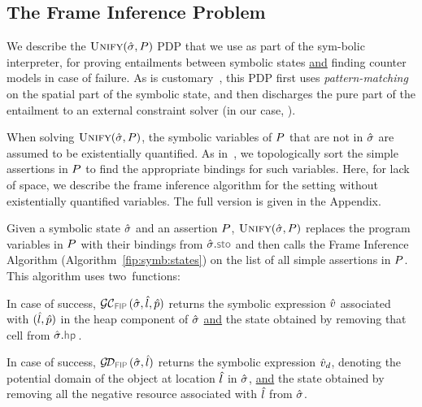 \subsection{The Frame Inference Problem}\label{subsec:fip}

We describe the $\textsc{Unify}(\hat{\sigma}, P)$ PDP that we
use as part of the \jsil sym-bolic interpreter, for proving entailments 
between symbolic states \underline{and} finding counter 
models in case of failure.  
As is customary~\cite{javert,jacobs2011verifast,sepwithsmt}, this PDP first uses \emph{pattern-matching} 
on the spatial part of the symbolic state, and then discharges the pure part of the 
entailment to an external constraint solver (in our case, \rosette). 



When solving $\textsc{Unify}(\hat{\sigma}, P)$, the symbolic variables of $P$ that are not 
in $\hat{\sigma}$ are assumed to be existentially quantified. 
As in~\cite{nguyen:vmcai:2008}, we 
topologically sort the simple assertions in $P$ to find the appropriate bindings 
for such variables. Here, for lack of space, we describe the frame inference 
algorithm for the setting without existentially quantified variables. 
The full version is given in the Appendix.  

Given a symbolic state $\hat{\sigma}$ and an assertion $P$, $\textsc{Unify}(\hat{\sigma}, P)$ 
 replaces the program variables in $P$ with their bindings 
from $\sstate.\stosel$ and then calls the Frame Inference Algorithm (Algorithm~\ref{fip:symb:states}) 
 on the list of all simple assertions in $P$. This algorithm uses two~functions: 

\begin{description}
\setlength{\itemsep}{0.2em}
  \item[FIP GetCell.] In case of success, $\GetCellV{\sstate, \sloc, \sexprp}$ returns 
          the symbolic expression $\hat{v}$ associated with 
          $(\hat{l}, \hat{p})$ in the heap component of $\hat{\sigma}$ \underline{and} 
          the state obtained by removing that cell from $\sstate.\hpsel$.
  
  \item[FIP GetDomain.] In case of success, $\GetDomainV{\sstate, \sloc}$ returns 
          the symbolic expression $\hat{v}_d$, denoting the potential domain 
          of the object at location $\hat{l}$ in $\hat{\sigma}$, \underline{and} 
          the state obtained by removing all the negative resource associated with 
          $\hat{l}$ from $\hat{\sigma}$.  
%  
\end{description}

